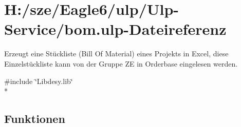 \hypertarget{bom_8ulp}{}\section{H\+:/sze/\+Eagle6/ulp/\+Ulp-\/\+Service/bom.ulp-\/\+Dateireferenz}
\label{bom_8ulp}


Erzeugt eine Stückliste (Bill Of Material) eines Projekts in Excel, diese Einzelstückliste kann von der Gruppe Z\+E in Orderbase eingelesen werden.  


{\ttfamily \#include \char`\"{}Libdesy.\+lib\char`\"{}}\\*
\subsection*{Funktionen}
